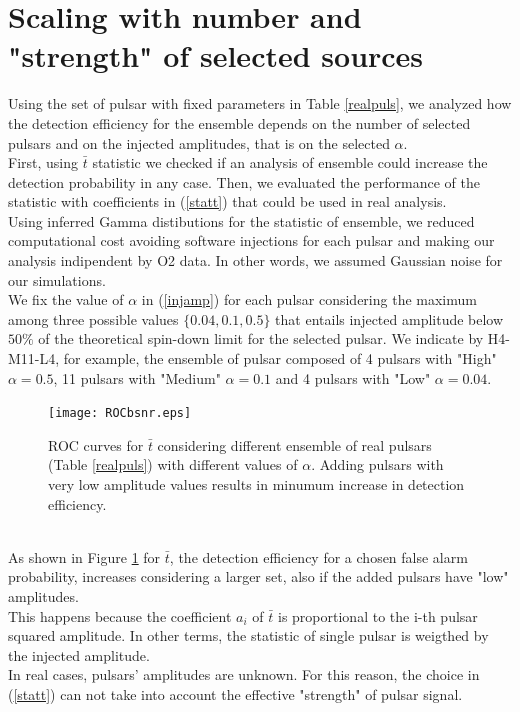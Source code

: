\documentclass[11pt,a4paper,final]{iopart}
\begin{document}
\section{Scaling with number and "strength" of selected sources}\label{cinque}
Using the set of pulsar with fixed parameters in Table \ref{realpuls}, we analyzed how the detection efficiency for the ensemble depends on the number of selected pulsars and on the injected amplitudes, that is on the selected $\alpha$.
\\ First, using $\bar{t}$ statistic we checked if an analysis of ensemble could increase the detection probability in any case. Then, we evaluated the performance of the statistic with coefficients in (\ref{statt}) that could be used in real analysis.
\\Using inferred Gamma distibutions for the statistic of ensemble, we reduced computational cost avoiding software injections for each pulsar and making our analysis indipendent by O2 data. In other words, we assumed Gaussian noise for our simulations. 
\\We fix the value of $\alpha$ in (\ref{injamp}) for each pulsar considering the maximum among three possible values $\{0.04,0.1,0.5\}$ that entails injected amplitude below $50\%$ of the theoretical spin-down limit for the selected pulsar. We indicate by H4-M11-L4, for example, the ensemble of pulsar composed of 4 pulsars with "High" $\alpha=0.5$, 11 pulsars with "Medium" $\alpha=0.1$ and 4 pulsars with "Low" $\alpha=0.04$.
\begin{figure}[htpb!]
\centering
    \texttt{[image: ROCbsnr.eps]}
    \caption{ ROC curves for $\bar{t}$ considering different ensemble of real pulsars (Table \ref{realpuls}) with different values of $\alpha$. Adding pulsars with very low amplitude values results in minumum increase in detection efficiency. }
    \label{bnsrt}
\vspace{-10pt}    
    \end{figure}
\\As shown in Figure \ref{bnsrt} for $\bar{t}$, the detection efficiency for a chosen false alarm probability, increases considering a larger set, also if the added pulsars have "low" amplitudes. \\This happens because the coefficient $a_i$ of $\bar{t}$ is proportional to the i-th pulsar squared amplitude. In other terms, the statistic of single pulsar is weigthed by the injected amplitude.
\\In real cases, pulsars' amplitudes are unknown. For this reason, the choice in (\ref{statt}) can not take into account the effective "strength" of pulsar signal.
\end{document}
